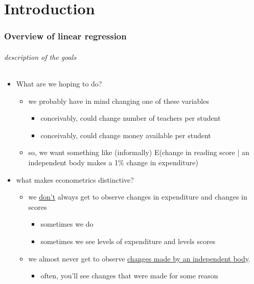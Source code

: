 

\part*{Introduction}%


\section{Overview of linear regression}

\paragraph{description of the goals}
\begin{itemize}
\item What are we hoping to do?
\begin{itemize}
\item we probably have in mind changing one of these variables
\begin{itemize}
\item conceivably, could change number of teachers per student
\item conceivably, could change money available per student
\end{itemize}
\item so, we want something like (informally) E(change in reading
          score | an independent body makes a 1\% change in expenditure)
\end{itemize}
\item what makes econometrics distinctive?
\begin{itemize}
\item we \underline{don't} always get to observe changes in expenditure and
          changes in scores
\begin{itemize}
\item sometimes we do
\item sometimes we see levels of expenditure and levels scores
\end{itemize}
\item we almost never get to observe \underline{changes made by an independent           body}.
\begin{itemize}
\item often, you'll see changes that were made for some reason
\end{itemize}
\end{itemize}
\end{itemize}


